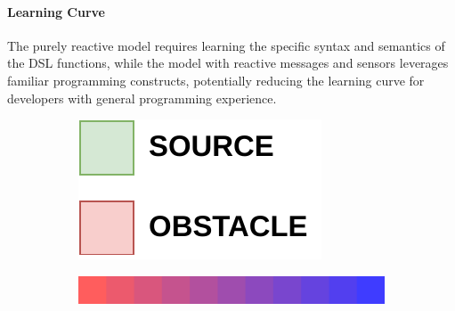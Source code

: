 \paragraph{Learning Curve}

The purely reactive model requires learning the specific syntax and semantics of the DSL functions, while the model with reactive messages and sensors leverages familiar programming constructs, potentially reducing the learning curve for developers with general programming experience.

\begin{figure}
    \centering
    \begin{subfigure}[b]{.15\textwidth}
        \centering
        \includegraphics[width=\textwidth]{figures/gradient-environment-legend.pdf}
        \label{fig:gradient-legend}
    \end{subfigure}
    \hfill
    \begin{subfigure}[b]{.49\textwidth}
        \centering
        \includegraphics[width=\textwidth]{figures/palette-cropped2.png}
        \label{fig:gradient-palette}
    \end{subfigure}
    \hfill
    \begin{subfigure}[b]{.49\textwidth}
        \centering

\end{subfigure}
\end{figure}
